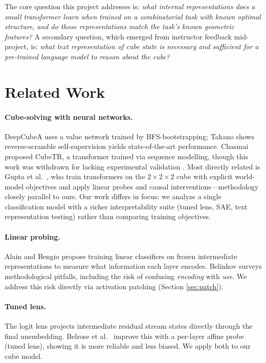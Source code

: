 \documentclass[12pt]{article}
\begin{document}
The core question this project addresses is: \emph{what internal representations
does a small transformer learn when trained on a combinatorial task with known
optimal structure, and do those representations match the task's known
geometric features?}  A secondary question, which emerged from instructor
feedback mid-project, is: \emph{what text representation of cube state is
necessary and sufficient for a pre-trained language model to reason about the
cube?}

\section{Related Work}

\paragraph{Cube-solving with neural networks.}
DeepCubeA \cite{agostinelli2019deepcubea} uses a value network trained by
BFS-bootstrapping; Takano \cite{takano2021selfsupervision} shows reverse-scramble
self-supervision yields state-of-the-art performance.  Chasmai proposed CubeTR, a transformer trained via sequence modelling, though
this work was withdrawn for lacking experimental validation
\cite{chasmai2021cubetr}.  Most directly related is Gupta et al.\
\cite{gupta2024worldmodels}, who train transformers on the $2{\times}2{\times}2$
cube with explicit world-model objectives and apply linear probes and causal
interventions---methodology closely parallel to ours.  Our work differs in focus:
we analyze a single classification model with a richer interpretability suite
(tuned lens, SAE, text representation testing) rather than comparing training
objectives.

\paragraph{Linear probing.}
Alain and Bengio \cite{alain2016probes} propose training linear classifiers on
frozen intermediate representations to measure what information each layer
encodes.  Belinkov \cite{belinkov2022probing} surveys methodological pitfalls,
including the risk of confusing \emph{encoding} with \emph{use}.  We address this
risk directly via activation patching (Section \ref{sec:patch}).

\paragraph{Tuned lens.}
The logit lens \cite{nostalgebraist2020logitlens} projects intermediate residual
stream states directly through the final unembedding.  Belrose et al.\
\cite{belrose2023tunedlens} improve this with a per-layer affine probe (tuned
lens), showing it is more reliable and less biased.  We apply both to our cube
model.
\end{document}
